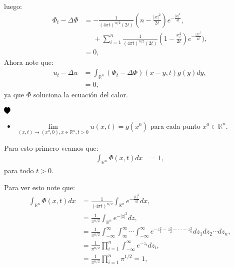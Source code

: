 \documentclass{beamer}
\newcommand{\heart}{\begin{tikzpicture}[scale=0.001cm,rotate=180]
\fill[black] (0,0) 
        .. controls (0,-0.5) and (0.3,-1.8) .. (2,-2)
        .. controls (4.2,-2) and (5.5,0) .. (5.5,3)
        .. controls (5.5,5.5) and (3.5,7.5) .. (0,10)
        .. controls (-3.5,7.5) and (-5.5,5.5) .. (-5.5,3)
        .. controls (-5.5,0) and (-4.2,-2) .. (-2,-2)
        .. controls (-0.3,-1.8) and (0,-0.5) .. (0,0);
\end{tikzpicture}}
\newcommand{\demostrado}[0]{ \begin{flushright} $\heart{}$ \end{flushright}}
\begin{document}
\begin{frame}
  \begin{block}{}
    luego:
    \begin{align*}
      \Phi_t-\Delta\Phi&=-\frac{1}{(4\pi t)^{n/2}(2t)}\left( n-\frac{|x|^2}{2t} \right)e^{-\frac{|x|^2}{4t}},\\
      &\phantom{=}+\sum_{i=1}^{n}\frac{1}{(4\pi t)^{n/2}(2t)}\left( 1-\frac{x_i^2}{2t} \right)e^{-\frac{|x|^2}{4t}}),\\
      &=0,
    \end{align*}
    Ahora note que:
    \begin{align*}
      u_t-\Delta u&=\int_{\mathbb{R}^{n}}(\Phi_t-\Delta\Phi)(x-y,t)g(y)dy,\\
      &=0,
    \end{align*}
    ya que $\Phi$ soluciona la ecuación del calor.
    \demostrado
  \end{block}
\end{frame}

\begin{frame}
  \begin{block}{}
    \begin{itemize}
      \item $\underset{(x,t)\rightarrow(x^0,0),x\in\mathbb{R}^{n},t>0}{\lim}u(x,t)=g(x^0)$ para cada punto $x^0\in\mathbb{R}^{n}$.
    \end{itemize}
    Para esto primero veamos que:
    \begin{align*}
      \int_{\mathbb{R}^{n}}\Phi(x,t)dx&=1,
    \end{align*}
    para todo $t>0$.\\
  \end{block}
\end{frame}

\begin{frame}
  \begin{block}{}
    Para ver esto note que:
    \begin{align*}
      \int_{\mathbb{R}^{n}}\Phi(x,t)dx&=\frac{1}{(4\pi t)^{n/2}}\int_{\mathbb{R}^{n}}e^{-\frac{|x|^2}{4t}}dx,\\
      &=\frac{1}{\pi^{n/2}}\int_{\mathbb{R}^{n}}e^{-|z|^2}dz ,\\
      &=\frac{1}{\pi^{n/2}}\int_{-\infty}^{\infty}\int_{\infty}^{\infty}\cdots \int_{-\infty}^{\infty}e^{-z_1^2-z_2^2-\cdots-z_n^2}dz_1dz_2\cdots dz_n,\\
      &=\frac{1}{\pi^{n/2}}\prod_{i=1}^{n}\int_{-\infty}^{\infty}e^{-z_i}dz_i,\\
      &=\frac{1}{\pi^{n/2}}\prod_{i=1}^{n}\pi^{1/2}=1,
    \end{align*}
  \end{block}
\end{frame}
\end{document}

